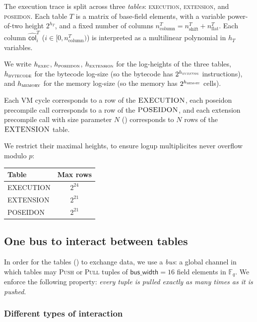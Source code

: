 \documentclass{article}
\theoremstyle{definition}
\newcommand{\Fq}{\mathbb F_q}
\begin{document}
The execution trace is split across three \textit{tables}: \textsc{execution}, \textsc{extension}, and \textsc{poseidon}. Each table $T$ is a matrix of base-field elements, with a variable power-of-two height $2^{h_T}$, and a fixed number of columns $n_\text{column}^T = n_\text{shift}^T + n_\text{flat}^T$. Each column $\hat{\textsf{col}}^T_i$ ($i \in [0, n_\text{column}^T)$) is interpreted as a multilinear polynomial in ${h_T}$ variables.

We write $h_\textsc{exec}$, $h_\textsc{poseidon}$, $h_\textsc{extension}$ for the log-heights of the three tables, $h_\textsc{bytecode}$ for the bytecode log-size (so the bytecode has $2^{h_\textsc{bytecode}}$ instructions), and $h_\textsc{memory}$ for the memory log-size (so the memory has $2^{h_\textsc{memory}}$ cells).

Each VM cycle corresponds to a row of the $\textsc{EXECUTION}$, each poseidon precompile call corresponds to a row of the $\textsc{POSEIDON}$, and each extension precompile call with size parameter $N$ () corresponds to $N$ rows of the $\textsc{EXTENSION}$ table.

We restrict their maximal heights, to ensure logup multiplicites never overflow modulo $p$:

\begin{center}
\begin{tabular}{lc}
\toprule
Table & Max rows \\
\midrule
\textsc{EXECUTION} & $2^{24}$ \\
\textsc{EXTENSION} & $2^{21}$ \\
\textsc{POSEIDON} & $2^{21}$ \\
\bottomrule
\end{tabular}
\end{center}

\subsection{One bus to interact between tables}\label{sec:bus-interactions}


In order for the tables () to exchange data, we use a \emph{bus}: a global channel in which tables may \textsc{Push} or \textsc{Pull} tuples of $\textsf{bus\_width} = 16$ field elements in $\Fq$. We enforce the following property: \textit{every tuple is pulled exactly as many times as it is pushed}.

\subsubsection{Different types of interaction}
\end{document}

